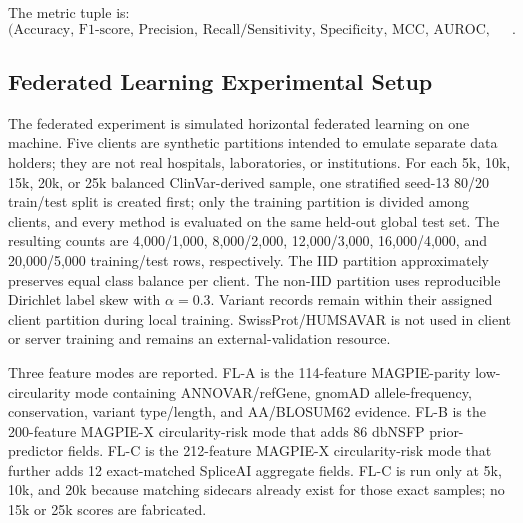 \documentclass[conference]{IEEEtran}
\begin{document}
The metric tuple is:
\[
\text{(Accuracy, F1-score, Precision, Recall/Sensitivity, Specificity, MCC, AUROC, AUPRC, Brier, ECE)}.
\]

\subsection{Federated Learning Experimental Setup}
The federated experiment is simulated horizontal federated learning on one machine. Five clients are synthetic partitions intended to emulate separate data holders; they are not real hospitals, laboratories, or institutions. For each 5k, 10k, 15k, 20k, or 25k balanced ClinVar-derived sample, one stratified seed-13 80/20 train/test split is created first; only the training partition is divided among clients, and every method is evaluated on the same held-out global test set. The resulting counts are 4,000/1,000, 8,000/2,000, 12,000/3,000, 16,000/4,000, and 20,000/5,000 training/test rows, respectively. The IID partition approximately preserves equal class balance per client. The non-IID partition uses reproducible Dirichlet label skew with $\alpha=0.3$. Variant records remain within their assigned client partition during local training. SwissProt/HUMSAVAR is not used in client or server training and remains an external-validation resource.

Three feature modes are reported. FL-A is the 114-feature MAGPIE-parity low-circularity mode containing ANNOVAR/refGene, gnomAD allele-frequency, conservation, variant type/length, and AA/BLOSUM62 evidence. FL-B is the 200-feature MAGPIE-X circularity-risk mode that adds 86 dbNSFP prior-predictor fields. FL-C is the 212-feature MAGPIE-X circularity-risk mode that further adds 12 exact-matched SpliceAI aggregate fields. FL-C is run only at 5k, 10k, and 20k because matching sidecars already exist for those exact samples; no 15k or 25k scores are fabricated.
\end{document}
